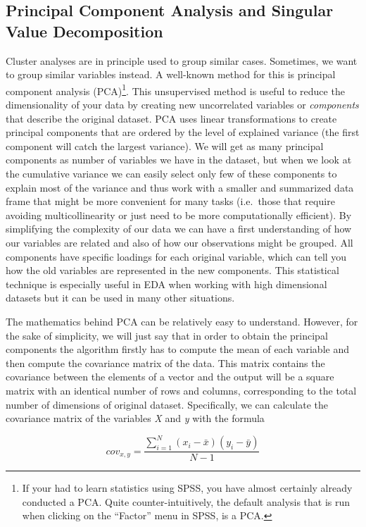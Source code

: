 \subsection{Principal Component Analysis and Singular Value Decomposition}
\label{sec:pcasvd}
Cluster analyses are in principle used to group similar
cases. Sometimes, we want to group similar variables instead.  A
well-known method for this is principal component analysis (PCA)\footnote{If your had to learn statistics using SPSS, you have almost certainly already conducted a PCA. Quite counter-intuitively, the default analysis that is run when clicking on the ``Factor'' menu in SPSS, is a PCA.}. This
unsupervised method is useful to reduce the dimensionality of your
data by creating new uncorrelated variables or \textit{components}
that describe the original dataset. PCA uses linear transformations to
create principal components that are ordered by the level of explained
variance (the first component will catch the largest variance). We
will get as many principal components as number of variables we have
in the dataset, but when we look at the cumulative variance we can
easily select only few of these components to explain most of the
variance and thus work with a smaller and summarized data frame that
might be more convenient for many tasks (i.e.\ those that require
avoiding multicollinearity or just need to be more computationally
efficient). By simplifying the complexity of our data we can have a
first understanding of how our variables are related and also of how
our observations might be grouped. All components have specific loadings
for each original variable, which can tell you how the old variables
are represented in the new components. This statistical technique is
especially useful in EDA when working with high dimensional datasets
but it can be used in many other situations.

The mathematics behind PCA can be relatively easy to
understand. However, for the sake of simplicity, we will just say that
in order to obtain the principal components the algorithm firstly has
to compute the mean of each variable and then compute the covariance
matrix of the data. This matrix contains the covariance between the
elements of a vector and the output will be a square matrix with an 
identical number of rows and columns, corresponding to the total
number of dimensions of original dataset. Specifically, we can
calculate the covariance matrix of the variables \emph{X} and \emph{y}
with the formula

$$cov_{x,y}=\frac{\sum_{i=1}^{N}(x_{i}-\bar{x})(y_{i}-\bar{y})}{N-1}$$

